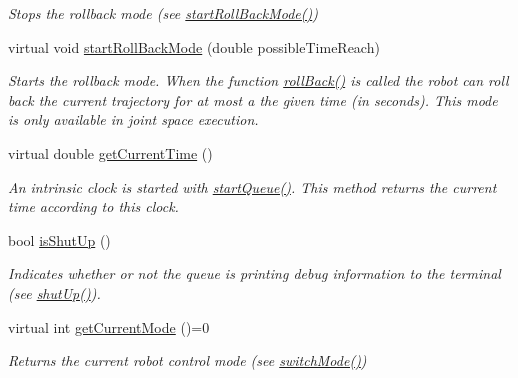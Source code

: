 \begin{DoxyCompactItemize}
\begin{DoxyCompactList}\small\item\em Stops the rollback mode (see \hyperlink{classkukadu_1_1ControlQueue_acb6ba5c61e9c26dcaa8e4073946e3791}{start\-Roll\-Back\-Mode()}) \end{DoxyCompactList}\item 
virtual void \hyperlink{classkukadu_1_1ControlQueue_acb6ba5c61e9c26dcaa8e4073946e3791}{start\-Roll\-Back\-Mode} (double possible\-Time\-Reach)
\begin{DoxyCompactList}\small\item\em Starts the rollback mode. When the function \hyperlink{classkukadu_1_1ControlQueue_a650c486b9f78d3dec1db8741b575a0ab}{roll\-Back()} is called the robot can roll back the current trajectory for at most a the given time (in seconds). This mode is only available in joint space execution. \end{DoxyCompactList}\item 
virtual double \hyperlink{classkukadu_1_1ControlQueue_a35a0fc7a7b46b1f77dc6c4c8e34e5e58}{get\-Current\-Time} ()
\begin{DoxyCompactList}\small\item\em An intrinsic clock is started with \hyperlink{classkukadu_1_1ControlQueue_a35d6a6e4e7c8467691c11567fe21f340}{start\-Queue()}. This method returns the current time according to this clock. \end{DoxyCompactList}\item 
bool \hyperlink{classkukadu_1_1ControlQueue_af8d1c646ba20dc854675b6af5fcb6701}{is\-Shut\-Up} ()
\begin{DoxyCompactList}\small\item\em Indicates whether or not the queue is printing debug information to the terminal (see \hyperlink{classkukadu_1_1ControlQueue_a8e76e19772053274046193436b0cae1c}{shut\-Up()}). \end{DoxyCompactList}\item 
virtual int \hyperlink{classkukadu_1_1ControlQueue_afce92074c674d8a1b0127190fd0603cf}{get\-Current\-Mode} ()=0
\begin{DoxyCompactList}\small\item\em Returns the current robot control mode (see \hyperlink{classkukadu_1_1ControlQueue_a5defe63d9f1b9829676f9a31a4683911}{switch\-Mode()}) \end{DoxyCompactList}\end{DoxyCompactItemize}
